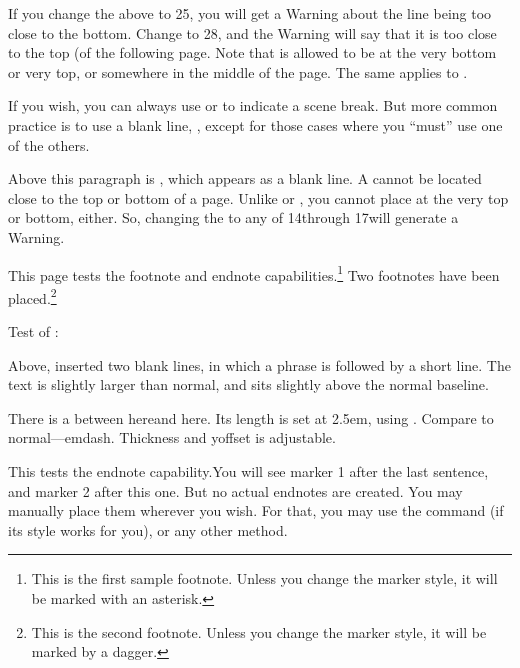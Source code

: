 \documentclass[test,shademargins,draft]{novel} %
\begin{document}
If you change the above \string\vspace\space to 25\string\nbs, you will get a Warning about the line being too close to the bottom. Change to 28\string\nbs, and the Warning will say that it is too close to the top (of the following page. Note that \string\scenestars\space is allowed to be at the very bottom or very top, or somewhere in the middle of the page. The same applies to \string\sceneline.

If you wish, you can always use \string\scenestars\space or \string\sceneline\space to indicate a scene break. But more common practice is to use a blank line, \string\scenebreak, except for those cases where you ``must'' use one of the others.

\scenebreak

Above this paragraph is \string\scenebreak, which appears as a blank line. A \string\scenebreak\space cannot be located close to the top or bottom of a page. Unlike \string\sceneline\space or \string\scenestars, you cannot place \string\scenebreak\space at the very top or bottom, either. So, changing the \string\vspace\space to any of 14\string\nbs\space through 17\string\nbs\space will generate a Warning.

\clearpage



This page tests the footnote and endnote capabilities.\footnote{This is the first sample footnote. Unless you change the marker style, it will be marked with an asterisk.} Two footnotes have been placed.\footnote{This is the second footnote. Unless you change the marker style, it will be marked by a dagger.}

\null

Test of \string\QuickChapter:



Above, \string\QuickChapter\space inserted two blank lines, in which a phrase is followed by a short line. The text is slightly larger than normal, and sits slightly above the normal baseline.

\null

There is a \string\bigemdash\space between here\makebox[2.5em]{\bigemdash}and here. Its length is set at 2.5em, using \string\makebox. Compare to normal—emdash. Thickness and yoffset is adjustable.

\null

This tests the endnote capability.\endnote You will see marker 1 after the last sentence, and marker 2 after this one.\endnote{} But no actual endnotes are created. You may manually place them wherever you wish. For that, you may use the \string\endnotetext\space command (if its style works for you), or any other method.
\end{document}
